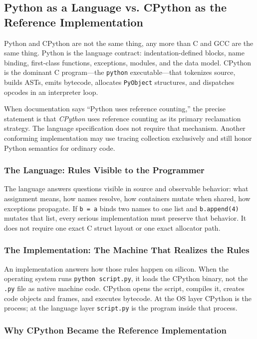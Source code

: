 \documentclass[a4paper,twoside]{report}
\begin{document}
\subsection{Python as a Language vs. CPython as the Reference Implementation}

Python and CPython are not the same thing, any more than C and GCC are the same thing. Python is the language contract: indentation-defined blocks, name binding, first-class functions, exceptions, modules, and the data model. CPython is the dominant C program---the \texttt{python} executable---that tokenizes source, builds ASTs, emits bytecode, allocates \texttt{PyObject} structures, and dispatches opcodes in an interpreter loop.

When documentation says ``Python uses reference counting,'' the precise statement is that \emph{CPython} uses reference counting as its primary reclamation strategy. The language specification does not require that mechanism. Another conforming implementation may use tracing collection exclusively and still honor Python semantics for ordinary code.

\subsubsection{The Language: Rules Visible to the Programmer}

The language answers questions visible in source and observable behavior: what assignment means, how names resolve, how containers mutate when shared, how exceptions propagate. If \texttt{b = a} binds two names to one list and \texttt{b.append(4)} mutates that list, every serious implementation must preserve that behavior. It does not require one exact C struct layout or one exact allocator path.

\subsubsection{The Implementation: The Machine That Realizes the Rules}

An implementation answers how those rules happen on silicon. When the operating system runs \texttt{python script.py}, it loads the CPython binary, not the \texttt{.py} file as native machine code. CPython opens the script, compiles it, creates code objects and frames, and executes bytecode. At the OS layer CPython is the process; at the language layer \texttt{script.py} is the program inside that process.

\subsubsection{Why CPython Became the Reference Implementation}
\end{document}
